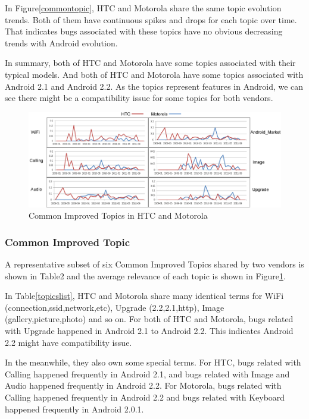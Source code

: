 \documentclass[10pt, conference, compsocconf]{IEEEtran}
\begin{document}
In Figure\ref{commontopic}, HTC and Motorola share the same topic evolution trends. Both of them have continuous spikes and drops for each topic over time. That indicates bugs associated with these topics have no obvious decreasing trends with Android evolution.

In summary, both of HTC and Motorola have some topics associated with their typical models. And both of HTC and Motorola have some topics associated with Android 2.1 and Android 2.2. As the topics represent features in Android, we can see there might be a compatibility issue for some topics for both vendors. 

\begin{figure}[htb]
\centering
\includegraphics[width=1\textwidth]{fixtopic.png}
\caption{Common Improved Topics in HTC and Motorola}
\label{fixtopic}
\end{figure}

\subsubsection{Common Improved Topic}

A representative subset of six Common Improved Topics shared by two vendors is shown in Table2 and the average relevance of each topic is shown in Figure\ref{fixtopic}.

In Table\ref{topicslist}, HTC and Motorola share many identical terms for WiFi (connection,ssid,network,etc), Upgrade (2.2,2.1,http), Image (gallery,picture,photo) and so on. For both of HTC and Motorola, bugs related with Upgrade happened in Android 2.1 to Android 2.2. This indicates Android 2.2 might have compatibility issue. 

In the meanwhile, they also own some special terms. For HTC, bugs related with Calling happened frequently in Android 2.1, and bugs related with Image and Audio happened frequently in Android 2.2. For Motorola, bugs related with Calling happened frequently in Android 2.2 and bugs related with Keyboard happened frequently in Android 2.0.1.
\end{document}
